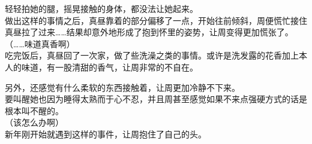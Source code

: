 轻轻拍她的腿，摇晃接触的身体，都没法让她起来。\\

做出这样的事情之后，真昼靠着的部分偏移了一点，开始往前倾斜，周便慌忙接住真昼拉了过来……结果却意外地形成了抱到怀里的姿势，让周变得更加慌张了。\\

（……味道真香啊）\\

吃完饭后，真昼回了一次家，做了些洗澡之类的事情。或许是洗发露的花香加上本人的味道，有一股清甜的香气，让周非常的不自在。

另外，还感觉有什么柔软的东西接触着，让周更加冷静不下来。\\

要叫醒她也因为睡得太熟而于心不忍，并且周甚至感觉如果不来点强硬方式的话是根本叫不醒的。\\

（该怎么办啊）\\

新年刚开始就遇到这样的事件，让周抱住了自己的头。\\
